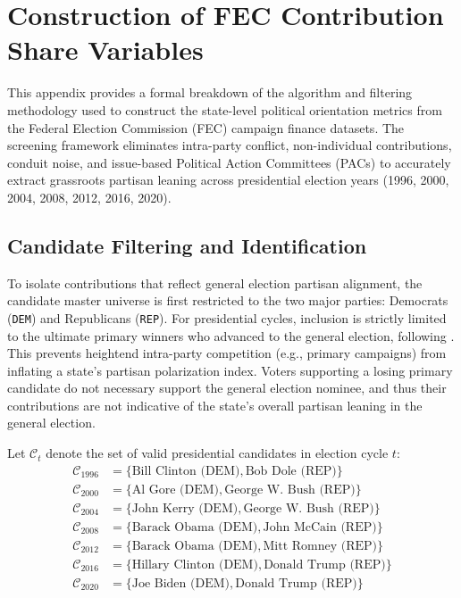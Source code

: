 
\section{Construction of FEC Contribution Share Variables}
\label{sec:appendix_fecscreen}

This appendix provides a formal breakdown of the algorithm and filtering methodology used to construct the state-level political orientation metrics from the Federal Election Commission (FEC) campaign finance datasets. The screening framework eliminates intra-party conflict, non-individual contributions, conduit noise, and issue-based Political Action Committees (PACs) to accurately extract grassroots partisan leaning across presidential election years (1996, 2000, 2004, 2008, 2012, 2016, 2020).

\subsection{Candidate Filtering and Identification}
To isolate contributions that reflect general election partisan alignment, the candidate master universe is first restricted to the two major parties: Democrats (\texttt{DEM}) and Republicans (\texttt{REP}). For presidential cycles, inclusion is strictly limited to the ultimate primary winners who advanced to the general election, following \citet{meeuwis2022}. This prevents heightend intra-party competition (e.g., primary campaigns) from inflating a state's partisan polarization index. Voters supporting a losing primary candidate do not necessary support the general election nominee, and thus their contributions are not indicative of the state's overall partisan leaning in the general election.

Let $\mathcal{C}_t$ denote the set of valid presidential candidates in election cycle $t$:
\begin{align*}
    \mathcal{C}_{1996} &= \{\text{Bill Clinton (DEM)}, \text{Bob Dole (REP)}\} \\
    \mathcal{C}_{2000} &= \{\text{Al Gore (DEM)}, \text{George W. Bush (REP)}\} \\
    \mathcal{C}_{2004} &= \{\text{John Kerry (DEM)}, \text{George W. Bush (REP)}\} \\
    \mathcal{C}_{2008} &= \{\text{Barack Obama (DEM)}, \text{John McCain (REP)}\} \\
    \mathcal{C}_{2012} &= \{\text{Barack Obama (DEM)}, \text{Mitt Romney (REP)}\} \\
    \mathcal{C}_{2016} &= \{\text{Hillary Clinton (DEM)}, \text{Donald Trump (REP)}\} \\
    \mathcal{C}_{2020} &= \{\text{Joe Biden (DEM)}, \text{Donald Trump (REP)}\}
\end{align*}

